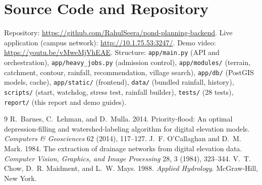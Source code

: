 \documentclass[manuscript,screen,review]{acmart}
\begin{document}
\section{Source Code and Repository}
Repository: \url{https://github.com/RahulSeera/pond-planning-backend}. Live application (campus network): \url{http://10.1.75.53:3247/}. Demo video: \url{https://youtu.be/vMweMjVhEAE}. Structure: \texttt{app/main.py} (API and orchestration), \texttt{app/heavy\_jobs.py} (admission control), \texttt{app/modules/} (terrain, catchment, contour, rainfall, recommendation, village search), \texttt{app/db/} (PostGIS models, cache), \texttt{app/static/} (frontend), \texttt{data/} (bundled rainfall, history), \texttt{scripts/} (start, watchdog, stress test, rainfall builder), \texttt{tests/} (28 tests), \texttt{report/} (this report and demo guides).

\begin{thebibliography}{9}
R.~Barnes, C.~Lehman, and D.~Mulla. 2014. Priority-flood: An optimal depression-filling and watershed-labeling algorithm for digital elevation models. \emph{Computers \& Geosciences} 62 (2014), 117--127.
J.~F. O'Callaghan and D.~M. Mark. 1984. The extraction of drainage networks from digital elevation data. \emph{Computer Vision, Graphics, and Image Processing} 28, 3 (1984), 323--344.
V.~T. Chow, D.~R. Maidment, and L.~W. Mays. 1988. \emph{Applied Hydrology}. McGraw-Hill, New York.
\end{thebibliography}
\end{document}
